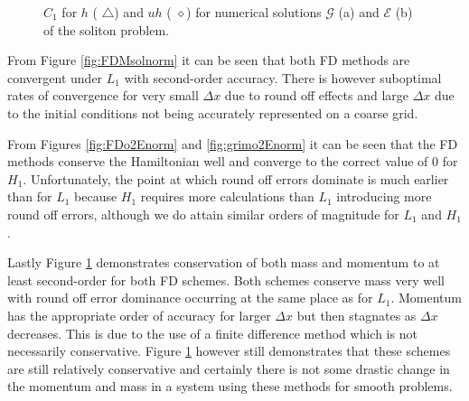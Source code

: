 \documentclass[SingleSpace,12pt,Journal]{Serre_ASCE}
\begin{document}
\begin{figure}
\centering
{}
\caption{$C_1$ for $h$ ({\color{red} $\triangle$}) and $uh$ ({\color{black} $\diamond$}) for numerical solutions $\mathcal{G}$ (a) and $\mathcal{E}$ (b) of the soliton problem.}
\label{fig:FDMsolnormC1}
\end{figure}
%
From Figure \ref{fig:FDMsolnorm} it can be seen that both FD methods are convergent under $L_1$ with second-order accuracy. There is however suboptimal rates of convergence for very small $\Delta x$ due to round off effects and large $\Delta x$ due to the initial conditions not being accurately represented on a coarse grid. 

From Figures \ref{fig:FDo2Enorm} and \ref{fig:grimo2Enorm} it can be seen that the FD methods conserve the Hamiltonian well and converge to the correct value of $0$ for $H_1$. Unfortunately, the point at which round off errors dominate is much earlier than for $L_1$ because $H_1$ requires more calculations than $L_1$ introducing more round off errors, although we do attain similar orders of magnitude for $L_1$ and $H_1$. 

Lastly Figure \ref{fig:FDMsolnormC1} demonstrates conservation of both mass and momentum to at least second-order for both FD schemes. Both schemes conserve mass very well with round off error dominance occurring at the same place as for $L_1$. Momentum has the appropriate order of accuracy for larger $\Delta x$ but then stagnates as $\Delta x$ decreases. This is due to the use of a finite difference method which is not necessarily conservative. Figure \ref{fig:FDMsolnormC1} however still demonstrates that these schemes are still relatively conservative and certainly there is not some drastic change in the momentum and mass in a system using these methods for smooth problems.  
\end{document}
